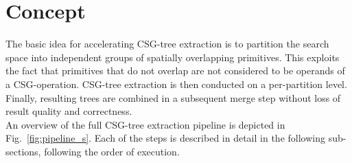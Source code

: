 \section{Concept}
\label{sec:concept}
The basic idea for accelerating \ac{CSG}-tree extraction is to partition the search space into independent groups of spatially overlapping primitives.
This exploits the fact that primitives that do not overlap are not considered to be operands of a \ac{CSG}-operation.
\ac{CSG}-tree extraction is then conducted on a per-partition level. 
Finally, resulting trees are combined in a subsequent merge step without loss of result quality and correctness. 
\\
An overview of the full \ac{CSG}-tree extraction pipeline is depicted in Fig.~\ref{fig:pipeline_s}. 
Each of the steps is described in detail in the following sub-sections, following the order of execution.
